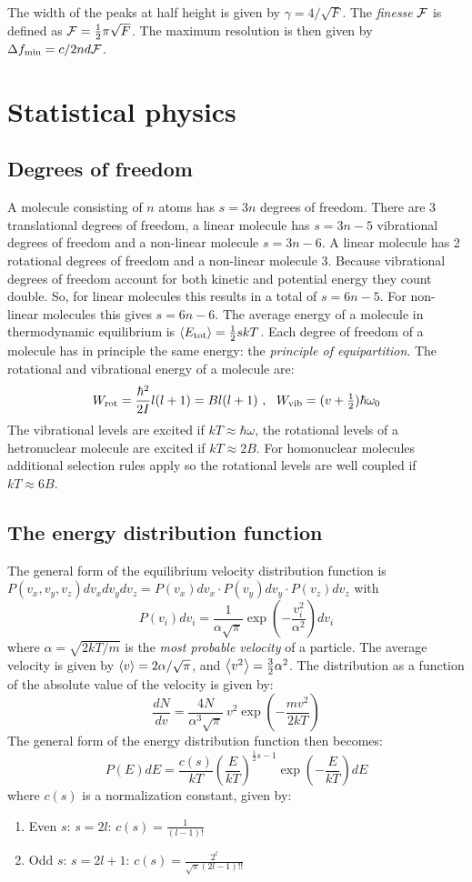 \documentclass[twoside]{report}
\begin{document}
\npar
The width of the peaks at half height is given by $\gamma=4/\sqrt{F}$.
The {\it finesse} $\cal F$ is defined as ${\cal F}=\mbox{$\frac{1}{2}$}\pi\sqrt{F}$. The
maximum resolution is then given by $\Delta f_{\rm min}=c/2nd{\cal F}$.

\chapter{Statistical physics}
\section{Degrees of freedom}
A molecule consisting of $n$ atoms has $s=3n$ degrees of freedom. There are
3 translational degrees of freedom, a linear molecule has $s=3n-5$
vibrational degrees of freedom and a non-linear molecule $s=3n-6$. A linear
molecule has 2 rotational degrees of freedom and a non-linear molecule 3.
\npar
Because vibrational degrees of freedom account for both kinetic and potential
energy they count double. So, for linear molecules this results in a total of
$s=6n-5$. For non-linear molecules this gives $s=6n-6$. The average energy of
a molecule in thermodynamic equilibrium is $\left\langle E_{\rm tot} \right\rangle=\frac{1}{2}skT$.
Each degree of freedom of a molecule has in principle the same energy: the
{\it principle of equipartition}.
\npar
The rotational and vibrational energy of a molecule are:
\[
W_{\rm rot}=\frac{\hbar^2}{2I}l(l+1)=Bl(l+1)~,~~W_{\rm vib}=(v+\mbox{$\frac{1}{2}$})\hbar\omega_0
\]
The vibrational levels are excited if $kT\approx\hbar\omega$, the
rotational levels of a hetronuclear molecule are excited if $kT\approx2B$.
For homonuclear molecules additional selection rules apply so the rotational
levels are well coupled if $kT\approx6B$.

\section{The energy distribution function}
The general form of the equilibrium velocity distribution function is\\
$P(v_x,v_y,v_z)dv_xdv_ydv_z=P(v_x)dv_x\cdot P(v_y)dv_y\cdot P(v_z)dv_z$ with
\[
P(v_i)dv_i=\frac{1}{\alpha\sqrt{\pi}}\exp\left(-\frac{v_i^2}{\alpha^2}\right)dv_i
\]
where $\alpha=\sqrt{2kT/m}$ is the {\it most probable velocity} of a particle.
The average velocity is given by $\left\langle v \right\rangle=2\alpha/\sqrt{\pi}$, and
$\left\langle v^2 \right\rangle=\frac{3}{2}\alpha^2$. The distribution as a function of the
absolute value of the velocity is given by:
\[
\frac{dN}{dv}=\frac{4N}{\alpha^3\sqrt{\pi}}~v^2\exp\left(-\frac{mv^2}{2kT}\right)
\]
The general form of the energy distribution function then becomes:
\[
P(E)dE=\frac{c(s)}{kT}\left(\frac{E}{kT}\right)^{\frac{1}{2}s-1}\exp\left(-\frac{E}{kT}\right)dE
\]
where $c(s)$ is a normalization constant, given by:
\begin{enumerate}
\item Even $s$: $s=2l$: $\displaystyle c(s)=\frac{1}{(l-1)!}$
\item Odd $s$: $s=2l+1$: $\displaystyle c(s)=\frac{2^l}{\sqrt{\pi}(2l-1)!!}$
\end{enumerate}
\end{document}
